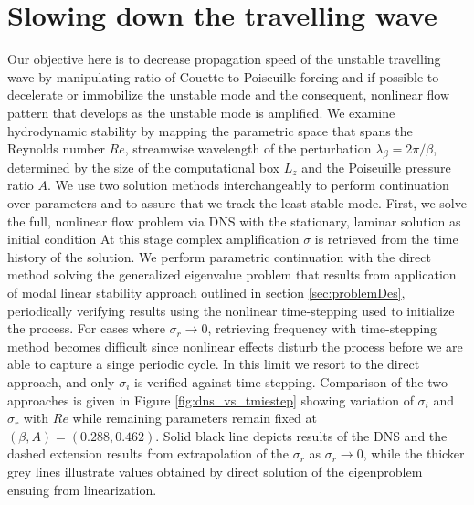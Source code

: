 \documentclass[lineno]{jfm}
\begin{document}
\section{Slowing down the travelling wave}\label{sec:linearStability}
Our objective here is to decrease propagation speed of the unstable travelling wave by manipulating ratio of Couette to Poiseuille forcing and if possible to decelerate or immobilize the unstable mode and the consequent,
nonlinear flow pattern that develops as the unstable mode is amplified.
We examine hydrodynamic stability by mapping the parametric space that spans the Reynolds number $Re$,
streamwise wavelength of the perturbation $\lambda_\beta = 2\pi/\beta$, determined by the size of the computational box $L_z$ and the Poiseuille pressure ratio $A$.
We use two solution methods interchangeably to perform continuation over parameters and to assure that we track the least stable mode.
First, we solve the full, nonlinear flow problem via DNS with the stationary, laminar solution as initial condition
At this stage complex amplification $\sigma$ is retrieved from the time history of the solution.
We   perform parametric continuation with the direct method solving the generalized eigenvalue problem that results from application of modal linear stability approach outlined in section \ref{sec:problemDes}, periodically verifying results using the nonlinear time-stepping used to initialize the process.
For cases where $\sigma_r\to0$, retrieving frequency with time-stepping method becomes difficult since nonlinear effects disturb the process before we are able to capture a singe periodic cycle.
In this limit we resort to the direct approach, and only $\sigma_i$ is verified against time-stepping.
Comparison of the two approaches is given in Figure \ref{fig:dns_vs_tmiestep} showing variation of $\sigma_i$ and $\sigma_r$ with $Re$ while remaining parameters remain fixed at $(\beta,A)=(0.288, 0.462)$.
Solid black line depicts results of the DNS and the dashed extension results from extrapolation of the $\sigma_r$ as $\sigma_r\to0$, while the thicker grey lines illustrate values obtained by direct solution of the eigenproblem ensuing from linearization.
\end{document}
